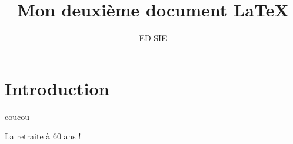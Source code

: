 \documentclass[10pt,a4paper]{article}
\title{Mon deuxième document \LaTeX}
\author{ED SIE}
\begin{document}
\maketitle
\tableofcontents

\section{Introduction}
coucou

La retraite à 60 ans !
\end{document}

